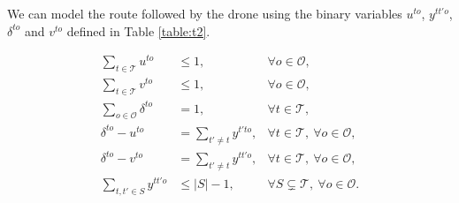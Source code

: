 \documentclass{itor}
\theoremstyle{definition}
\theoremstyle{remark}
\begin{document}
We can model the route followed by the drone using the binary variables $u^{to}$, $y^{tt'o}$, $\delta^{to}$ and $v^{to}$ defined in Table \ref{table:t2}.



\begin{align}
    \sum_{t\in \mathcal T} u^{to} & \leq 1, &\forall o\in \mathcal O, \label{st:DEnt}\\%
    \sum_{t\in \mathcal T} v^{to} & \leq 1, &\forall o\in \mathcal O, \label{st:DExt}\\%
    \sum_{o\in \mathcal O} \delta^{to} & = 1, &\forall t\in \mathcal T, \label{st:DIn} \\
    \delta^{to} - u^{to} & = \sum_{t'\neq t} y^{t'to}, &\forall t\in \mathcal T,\:\forall o\in \mathcal O, \label{st:Dinu}\\
    \delta^{to} - v^{to} & = \sum_{t'\neq t} y^{tt'o}, &\forall t\in \mathcal T,\:\forall o\in \mathcal O, \label{st:Dinv}\\
    \sum_{t, t'\in S}y^{tt'o} & \leq |S|-1, &\forall S\subsetneq\mathcal T,\:\forall o\in\mathcal O.
    \label{st:SEC}
\end{align}
\end{document}

